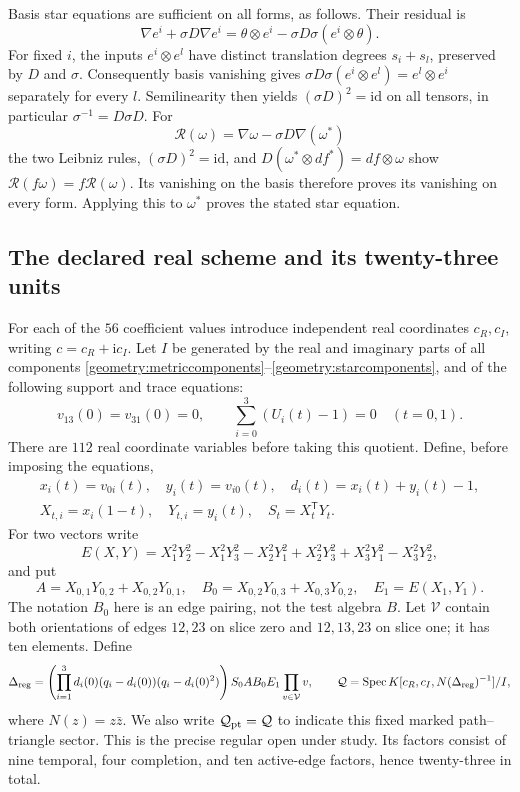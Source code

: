 \documentclass[11pt,a4paper]{article}
\theoremstyle{remark}\newtheorem{remark}[theorem]{Remark}
\newcommand{\Spec}{\operatorname{Spec}}\newcommand{\tr}{\operatorname{tr}}
\begin{document}
Basis star equations are sufficient on all forms, as follows. Their
residual is
\[
 \nabla e^i+\sigma D\nabla e^i
       =\theta\otimes e^i-\sigma D\sigma(e^i\otimes\theta).
\]
For fixed \(i\), the inputs \(e^i\otimes e^l\) have distinct
translation degrees \(s_i+s_l\), preserved by \(D\) and \(\sigma\).
Consequently basis vanishing gives
\(\sigma D\sigma(e^i\otimes e^l)=e^l\otimes e^i\) separately for every
\(l\). Semilinearity then yields \((\sigma D)^2=\mathrm{id}\) on all
tensors, in particular \(\sigma^{-1}=D\sigma D\).
For
\[
 \mathcal R(\omega)=\nabla\omega-\sigma D\nabla(\omega^*)
\]
the two Leibniz rules, \((\sigma D)^2=\mathrm{id}\), and
\(D(\omega^*\otimes df^*)=df\otimes\omega\) show
\(\mathcal R(f\omega)=f\mathcal R(\omega)\).
Its vanishing on the basis therefore proves its vanishing on every form.
Applying this to \(\omega^*\) proves the stated star equation.

\subsection{The declared real scheme and its twenty-three units}

For each of the \(56\) coefficient values introduce independent real
coordinates \(c_R,c_I\), writing \(c=c_R+\mathrm i c_I\). Let \(I\)
be generated by the real and imaginary parts of all components
\eqref{geometry:metriccomponents}--\eqref{geometry:starcomponents}, and
of the following support and trace equations:
\begin{equation}\label{geometry:support}
 v_{13}(0)=v_{31}(0)=0,\qquad
 \sum_{i=0}^3(U_i(t)-1)=0\quad(t=0,1).
\end{equation}
There are \(112\) real coordinate variables before taking this quotient.
Define, before imposing the equations,
\[
 \begin{gathered}
 x_i(t)=v_{0i}(t),\quad y_i(t)=v_{i0}(t),\quad
 d_i(t)=x_i(t)+y_i(t)-1,\\
 X_{t,i}=x_i(1-t),\quad Y_{t,i}=y_i(t),\quad
 S_t=X_t^{\mathsf T}Y_t.
 \end{gathered}
\]
For two vectors write
\[
 E(X,Y)=X_1^2Y_2^2-X_1^2Y_3^2-X_2^2Y_1^2+X_2^2Y_3^2
                   +X_3^2Y_1^2-X_3^2Y_2^2,
\]
and put
\[
 A=X_{0,1}Y_{0,2}+X_{0,2}Y_{0,1},\quad
 B_0=X_{0,2}Y_{0,3}+X_{0,3}Y_{0,2},\quad E_1=E(X_1,Y_1).
\]
The notation \(B_0\) here is an edge pairing, not the test algebra \(B\).
Let \(\mathcal V\) contain both orientations of edges \(12,23\) on
slice zero and \(12,13,23\) on slice one; it has ten elements. Define
\begin{equation}\label{geometry:intrinsicopen}
 \Delta_{\rm reg}=
 \left(\prod_{i=1}^3d_i(0)(q_i-d_i(0))(q_i-d_i(0)^2)\right)
           S_0 A B_0 E_1\prod_{v\in\mathcal V}v,
 \qquad
 \mathcal Q=\Spec K[c_R,c_I,N(\Delta_{\rm reg})^{-1}]/I,
\end{equation}
where \(N(z)=z\bar z\). We also write
\(\mathcal Q_{\rm pt}=\mathcal Q\) to indicate this fixed marked
path--triangle sector. This is the precise regular open under study.
Its factors consist of nine temporal, four completion, and ten active-edge
factors, hence twenty-three in total.
\end{document}
